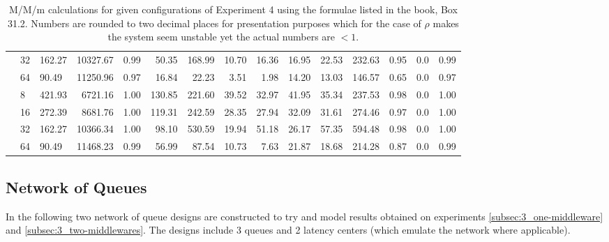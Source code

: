 \begin{table}
\begin{adjustwidth}{-1cm}{}
{\begin{tabular}{lllrrrrrrrrrrrr}
                                & 32 & 162.27 & 10327.67  & 0.99   & 50.35  & 168.99 & 10.70 & 16.36 & 16.95 & 22.53 & 232.63          & 0.95      & 0.0   & 0.99 \\
                                & 64 & 90.49  & 11250.96  & 0.97   & 16.84  & 22.23  & 3.51  & 1.98  & 14.20 & 13.03 & 146.57          & 0.65      & 0.0   & 0.97 \\
                        \addlinespace
                        288     & 8  & 421.93 & 6721.16   & 1.00   & 130.85 & 221.60 & 39.52 & 32.97 & 41.95 & 35.34 & 237.53          & 0.98      & 0.0   & 1.00 \\
                                & 16 & 272.39 & 8681.76   & 1.00   & 119.31 & 242.59 & 28.35 & 27.94 & 32.09 & 31.61 & 274.46          & 0.97      & 0.0   & 1.00 \\
                                & 32 & 162.27 & 10366.34  & 1.00   & 98.10  & 530.59 & 19.94 & 51.18 & 26.17 & 57.35 & 594.48          & 0.98      & 0.0   & 1.00 \\
                                & 64 & 90.49  & 11468.23  & 0.99   & 56.99  & 87.54  & 10.73 & 7.63  & 21.87 & 18.68 & 214.28          & 0.87      & 0.0   & 0.99 \\
                        \bottomrule
                    \end{tabular}
                    \caption{M/M/m calculations for given configurations of Experiment 4 using the formulae listed in
                             the book, Box 31.2. Numbers are rounded to two decimal places for presentation purposes
                             which for the case of $\rho$ makes the system seem unstable yet the actual numbers are
                             $< 1$.\label{tab:mmm}}
                }
            \end{adjustwidth}
        \end{table}

        \subsection{Network of Queues\label{subsec:7_noc}}

            In the following two network of queue designs are constructed to try and model results obtained on
            experiments \ref{subsec:3_one-middleware} and \ref{subsec:3_two-middlewares}. The designs include 3 queues
            and 2 latency centers (which emulate the network where applicable).

